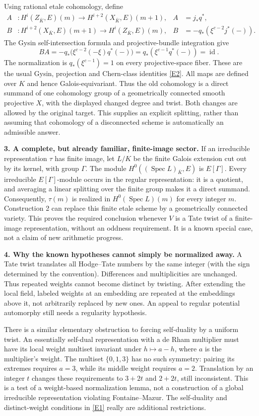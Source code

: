 \documentclass[11pt,a4paper]{article}
\newcommand{\eref}[2]{\hyperlink{extra:#1:#2}{[E#2]}}
\numberwithin{equation}{section}
\begin{document}
Using rational etale cohomology, define
\begin{align*}
 A &: H^i(Z_{\bar K},E)(m)\longrightarrow
          H^{i+2}(X_{\bar K},E)(m+1),& A&=j_*q^*,\\
 B &: H^{i+2}(X_{\bar K},E)(m+1)\longrightarrow
          H^i(Z_{\bar K},E)(m),& B&=-q_*(\xi^{c-2}j^*(-)).
\end{align*}
The Gysin self-intersection formula and projective-bundle integration give
\[
 BA=-q_*\bigl(\xi^{c-2}(-\xi)q^*(-)\bigr)
     =q_*(\xi^{c-1}q^*(-))=\operatorname{id}.
\]
The normalization is $q_*(\xi^{c-1})=1$ on every projective-space fiber.
These are the usual Gysin, projection and Chern-class identities
\eref{statement}{2}. All maps are defined over $K$ and hence Galois-equivariant.
Thus the old cohomology is a direct summand of one cohomology group of a
geometrically connected smooth projective $X$, with the displayed changed
degree and twist. Both changes are allowed by the original target.
This supplies an explicit splitting, rather than assuming that cohomology
of a disconnected scheme is automatically an admissible answer.

\textbf{3. A complete, but already familiar, finite-image sector.}
If an irreducible representation $\tau$ has finite image, let $L/K$ be the
finite Galois extension cut out by its kernel, with group $\Gamma$.
The module $H^0((\operatorname{Spec}L)_{\bar K},E)$ is $E[\Gamma]$.
Every irreducible $E[\Gamma]$-module occurs in the regular representation:
it is a quotient, and averaging a linear splitting over the finite group
makes it a direct summand. Consequently, $\tau(m)$ is realized in
$H^0(\operatorname{Spec}L)(m)$ for every integer $m$. Construction 2 can
replace this finite etale scheme by a geometrically connected variety.
This proves the required conclusion whenever $V$ is a Tate twist of a
finite-image representation, without an oddness requirement. It is a known
special case, not a claim of new arithmetic progress.

\textbf{4. Why the known hypotheses cannot simply be normalized away.}
A Tate twist translates all Hodge--Tate numbers by the same integer
(with the sign determined by the convention). Differences and multiplicities
are unchanged. Thus repeated weights cannot become distinct by twisting.
After extending the local field, labeled weights at an embedding are
repeated at the embeddings above it, not arbitrarily replaced by new ones.
An appeal to regular potential automorphy still needs a regularity hypothesis.

There is a similar elementary obstruction to forcing self-duality by a
uniform twist. An essentially self-dual representation with a de Rham
multiplier must have its local weight multiset invariant under
$h\mapsto a-h$, where $a$ is the multiplier's weight. The multiset
$\{0,1,3\}$ has no such symmetry: pairing its extremes requires $a=3$,
while its middle weight requires $a=2$. Translation by an integer $t$
changes these requirements to $3+2t$ and $2+2t$, still inconsistent.
This is a test of a weight-based normalization lemma, not a construction of
a global irreducible representation violating Fontaine--Mazur. The
self-duality and distinct-weight conditions in \eref{statement}{1} really are
additional restrictions.
\end{document}
